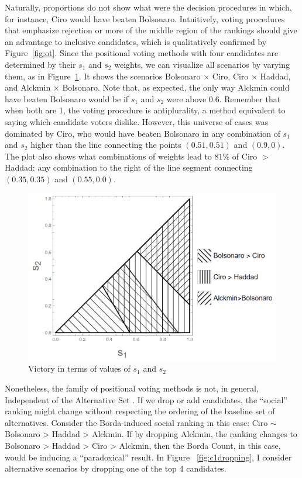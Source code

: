 \documentclass[hidelinks,11pt]{article} \usepackage[utf8]{inputenc}
\begin{document}
Naturally, proportions do not show what were the decision procedures in which,
for instance, Ciro would have beaten Bolsonaro. Intuitively, voting procedures
that emphasize rejection or more of the middle region of the rankings should
give an advantage to inclusive candidates, which is qualitatively confirmed by
Figure~\ref{fig:ot}. Since the positional voting methods with four candidates
are determined by their \(s_{1}\) and \(s_{2}\) weights, we can visualize all
scenarios by varying them, as in Figure~\ref{fig:positional4c}. It shows the
scenarios Bolsonaro \(\times\) Ciro, Ciro \(\times \) Haddad, and Alckmin
\(\times\) Bolsonaro. Note that, as expected, the only way Alckmin could have
beaten Bolsonaro would be if \(s_{1}\) and \(s_{2}\) were above 0.6. Remember
that when both are 1, the voting procedure is antiplurality, a method equivalent
to saying which candidate voters dislike. However, this universe of cases was
dominated by Ciro, who would have beaten Bolsonaro in any combination of
\(s_{1}\) and \(s_{2}\) higher than the line connecting the points
\((0.51,0.51)\) and \((0.9,0)\). The plot also shows what combinations of
weights lead to \(81\%\) of Ciro \(>\) Haddad: any combination to the right of
the line segment connecting \((0.35,0.35)\) and \((0.55,0.0)\).

\begin{figure}[!h] \centering \includegraphics[width=\columnwidth,
height=0.3\textheight]{./images/counterfactual_triangle.png}
\caption{Victory in terms of values of \(s_{1}\) and \(s_{2}\)}
 \label{fig:positional4c}
\end{figure}


Nonetheless, the family of positional voting methods is not, in general, Independent
of the Alternative Set \parencite{kaminski2015empirical}. If we drop or add
candidates, the ``social'' ranking might change without respecting the ordering
of the baseline set of alternatives. Consider the Borda-induced social ranking
in this case: Ciro \( \sim \) Bolsonaro > Haddad > Alckmin. If by dropping
Alckmin, the ranking changes to Bolsonaro > Haddad > Ciro > Alckmin, then the
Borda Count, in this case, would be inducing a ``paradoxical'' result. In Figure
~\ref{fig:c1dropping}, I consider alternative scenarios by dropping one of the
top 4 candidates.
\end{document}
